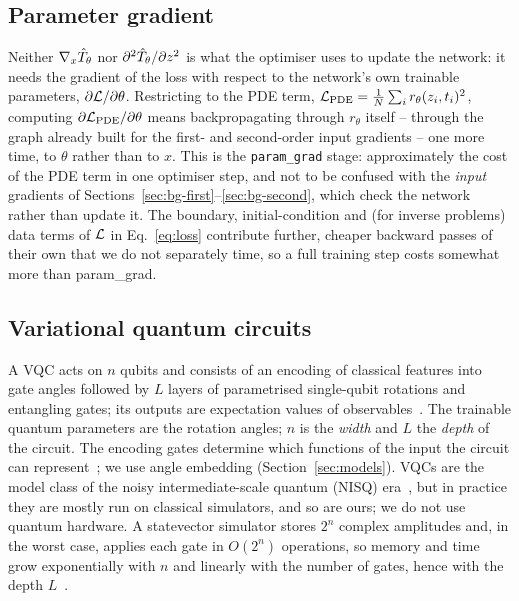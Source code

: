 \subsection{Parameter gradient}
\label{sec:bg-param}
Neither $\nabla_x\hat T_\theta$ nor $\partial^2\hat T_\theta/\partial z^2$ is what the optimiser uses to update the network: it needs
the gradient of the loss with respect to the network's own trainable parameters, $\partial\mathcal{L}/\partial\theta$.
Restricting to the PDE term, $\mathcal{L}_{\text{PDE}} = \tfrac1N\sum_i r_\theta(z_i,t_i)^2$, computing
$\partial\mathcal{L}_{\text{PDE}}/\partial\theta$ means backpropagating through $r_\theta$ itself -- through the
graph already built for the first- and second-order input gradients -- one more time, to $\theta$ rather than
to $x$. This is the \texttt{param\_grad} stage: approximately the cost of the PDE term in one optimiser step,
and not to be confused with the \emph{input} gradients of Sections~\ref{sec:bg-first}--\ref{sec:bg-second},
which check the network rather than update it. The boundary, initial-condition and (for inverse problems)
data terms of $\mathcal{L}$ in Eq.~\eqref{eq:loss} contribute further, cheaper backward passes of their own that we
do not separately time, so a full training step costs somewhat more than param\_grad.

\subsection{Variational quantum circuits}
\label{sec:bg-vqc}
A VQC acts on $n$ qubits and consists of an encoding of classical features into gate angles followed by
$L$ layers of parametrised single-qubit rotations and entangling gates; its outputs are expectation values
of observables~\cite{benedetti2019,cerezo2021}. The trainable quantum parameters are the rotation angles;
$n$ is the \emph{width} and $L$ the \emph{depth} of the circuit. The encoding gates determine which functions
of the input the circuit can represent~\cite{schuld2021encoding}; we use angle embedding
(Section~\ref{sec:models}). VQCs are the model class of the noisy intermediate-scale quantum (NISQ)
era~\cite{preskill2018}, but in practice they are mostly run on classical simulators, and so are ours; we do
not use quantum hardware.
A statevector simulator stores $2^n$ complex amplitudes and, in the worst case, applies each gate in
$O(2^n)$ operations, so memory and time grow exponentially with $n$ and linearly with the number of gates,
hence with the depth $L$~\cite{xu2023}.

